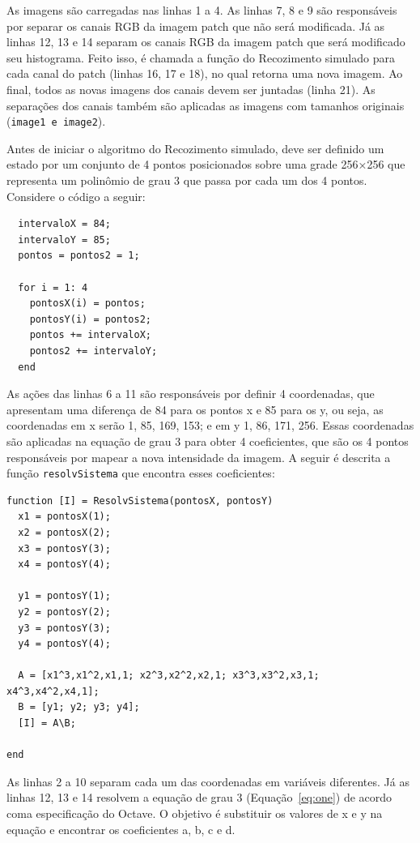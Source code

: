 As imagens são carregadas nas linhas 1 a 4. As linhas 7, 8 e 9 são responsáveis por separar os canais RGB da imagem patch que não será modificada. Já as linhas 12, 13 e 14 separam os canais RGB da imagem patch que será modificado seu histograma. Feito isso, é chamada a função do Recozimento simulado para cada canal do patch (linhas 16, 17 e 18), no qual retorna uma nova imagem. Ao final, todos as novas imagens dos canais devem ser juntadas (linha 21). As separações dos canais também são aplicadas as imagens com tamanhos originais (\texttt{image1 e image2}).

Antes de iniciar o algoritmo do Recozimento simulado, deve ser definido um estado por um conjunto de 4 pontos posicionados sobre uma grade 256×256 que representa um polinômio de grau 3 que passa por cada um dos 4 pontos. Considere o código a seguir:
 
\begin{lstlisting}[style=Matlab-editor]
%encontra 4 ponstos em x e 4 em y
  intervaloX = 84;
  intervaloY = 85;
  pontos = pontos2 = 1;
  
  for i = 1: 4
    pontosX(i) = pontos;
    pontosY(i) = pontos2;
    pontos += intervaloX;
    pontos2 += intervaloY;
  end  
\end{lstlisting}

As ações das linhas 6 a 11 são responsáveis por definir 4 coordenadas, que apresentam uma diferença de 84 para os pontos x e 85 para os y, ou seja, as coordenadas em x serão 1, 85, 169, 153; e em y 1, 86, 171, 256. Essas coordenadas  são aplicadas na equação de grau 3 para obter 4 coeficientes, que são os 4 pontos responsáveis por mapear a nova intensidade da imagem. A seguir é descrita a função \texttt{resolvSistema} que encontra esses coeficientes:

\begin{lstlisting}[style=Matlab-editor]
function [I] = ResolvSistema(pontosX, pontosY)
  x1 = pontosX(1);
  x2 = pontosX(2);
  x3 = pontosY(3);
  x4 = pontosY(4);

  y1 = pontosY(1);
  y2 = pontosY(2);
  y3 = pontosY(3);
  y4 = pontosY(4);
  
  A = [x1^3,x1^2,x1,1; x2^3,x2^2,x2,1; x3^3,x3^2,x3,1; x4^3,x4^2,x4,1];
  B = [y1; y2; y3; y4];
  [I] = A\B;

end
\end{lstlisting}

As linhas 2 a 10 separam cada um das coordenadas em variáveis diferentes. Já as linhas 12, 13 e 14 resolvem a equação de grau 3 (Equação~\ref{eq:one}) de acordo coma especificação do Octave. O objetivo é substituir os valores de x e y na equação e encontrar os coeficientes a, b, c e d.

